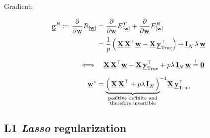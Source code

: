 \begin{frame}

Gradient:

\begin{align}
\vec g^R :=  \frac{\partial}{\partial \vec w} R_{[\vec w]}
&= \frac{\partial}{\partial \vec w} E^T_{[\vec w]} + \frac{\partial}{\partial \vec w} E^R_{[\vec w]}\\
&= \frac{1}{p} \left(\, \vec X \, \vec X^\top \vec w - \vec X\, \vec y_{\text{True}}^\top \right) + \vec I_N \, \lambda \, \vec w\\[2mm]
\iff& \quad \vec X \, \vec X^\top \vec w - \vec X\, \vec y_{\text{True}}^\top + p \lambda \, \vec I_N \,  \vec w \eqexcl \vec 0\\[2mm]
\vec w^* &=  {\underbrace{
\left(\, \vec X \, \vec X^\top + p \lambda \, \vec I_N \,  \right)
}_{
\substack{
\text{positive definite and}\\
\text{therefore invertible}\\
}
}
}^{-1} \vec X \, \vec y_{\mathrm{True}}^{\top}
\end{align}

\end{frame}

\subsection{L1 \emph{Lasso} regularization}

